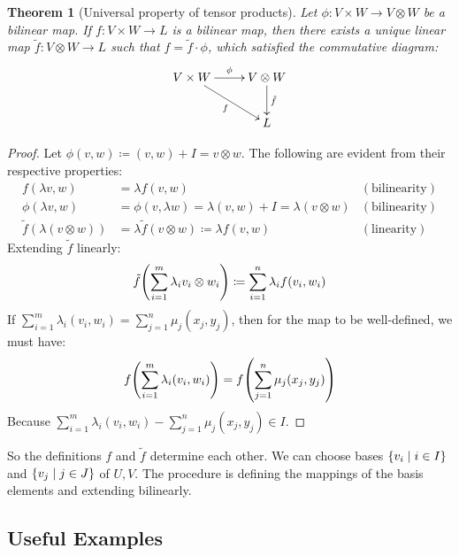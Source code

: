 \documentclass{article}
\newtheorem{Theorem}{Theorem}
\theoremstyle{definition}
\theoremstyle{remark}
\theoremstyle{underline}
\theoremstyle{underline}
\begin{document}
	\begin{Theorem}[Universal property of tensor products]
		Let $\phi \colon V \times W \to V \otimes W$ be a bilinear map. If $f \colon V \times W \to L$ is a bilinear map, then there exists a unique linear map $\tilde f \colon V \otimes W \to L$ such that $f = \tilde f \cdot \phi $, which satisfied the commutative diagram:
		\begin{gather*}
		\xymatrix{
		V \times W \ar[r]^{\phi} \ar[rd]_{f} & V \otimes W \ar[d]^{\tilde f} \\
		& L
		}
		\end{gather*}
	\end{Theorem}

	\begin{proof}
		Let $\phi(v,w) \coloneqq {(v,w) + I} = {v \otimes w}$. The following are evident from their respective properties:
		\begin{align*}
	    	f(\lambda v, w) & = \lambda f(v,w) & (\text{bilinearity}) \\
	  		\phi(\lambda v, w) & = \phi(v,\lambda w) = \lambda(v, w) + I = \lambda(v \otimes w) & (\text{bilinearity}) \\
	    	\tilde f(\lambda (v\otimes w)) & = \lambda\tilde f(v\otimes w) \coloneqq \lambda f(v,w) & (\text{linearity})
	    \end{align*}
		Extending $\tilde f$ linearly:
		\begin{gather*}
			\tilde f\pqty{\sum_{i=1}^m \lambda_i v_i \otimes w_i } \coloneqq \sum_{i = 1}^n \lambda_i f\pqty{v_i, w_i}
		\end{gather*}
		If $\sum_{i=1}^m \lambda_i (v_i,w_i) = \sum_{j=1}^n \mu_j (x_j,y_j)$, then for the map to be well-defined, we must have:
		\begin{gather*}
			f\pqty{\sum_{i=1}^m \lambda_i (v_i,w_i)} = f\pqty{\sum_{j=1}^n \mu_j (x_j,y_j)} 
		\end{gather*}
		Because $\sum_{i=1}^m \lambda_i (v_i,w_i) - \sum_{j=1}^n \mu_j (x_j,y_j) \in I$.
	\end{proof}

	So the definitions $f$ and $\tilde f$ determine each other. We can choose bases $\qty{v_i \mid i \in I}$ and $\qty{v_j \mid j \in J}$ of $U, V$. The procedure is defining the mappings of the basis elements and extending bilinearly.  

	\subsection{Useful Examples}
\end{document}
